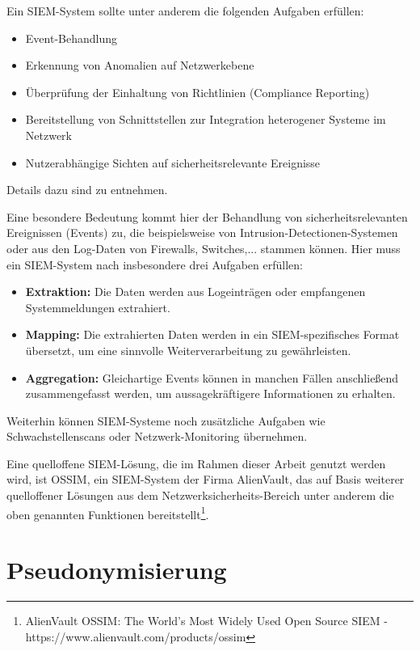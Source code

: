 \documentclass[
    fontsize=12pt,
    headings=small,
    parskip=half,           %
    bibliography=totoc,
    numbers=noenddot,       %
    open=any,               %
   final                   %
    ]{scrreprt}
\begin{document}
Ein SIEM-System sollte unter anderem die folgenden Aufgaben erfüllen: 
\begin{itemize}
	\item Event-Behandlung
	\item Erkennung von Anomalien auf Netzwerkebene
	\item Überprüfung der Einhaltung von Richtlinien (Compliance Reporting)
	\item Bereitstellung von Schnittstellen zur Integration heterogener Systeme im Netzwerk %
	\item Nutzerabhängige Sichten auf sicherheitsrelevante Ereignisse %
\end{itemize} 
Details dazu sind \cite{detken2015} zu entnehmen.

Eine besondere Bedeutung kommt hier der Behandlung von sicherheitsrelevanten Ereignissen (Events) zu, die beispielsweise von Intrusion-Detectionen-Systemen oder aus den Log-Daten von Firewalls, Switches,... stammen können. Hier muss ein SIEM-System nach \cite{detken2014} insbesondere drei Aufgaben erfüllen:
\begin{itemize}
	\item \textbf{Extraktion:} Die Daten werden aus Logeinträgen oder empfangenen Systemmeldungen extrahiert. 
	\item \textbf{Mapping:} Die extrahierten Daten werden in ein SIEM-spezifisches Format übersetzt, um eine sinnvolle Weiterverarbeitung zu gewährleisten.
	\item \textbf{Aggregation:} Gleichartige Events können in manchen Fällen anschließend zusammengefasst werden, um aussagekräftigere Informationen zu erhalten.
\end{itemize}

Weiterhin können SIEM-Systeme noch zusätzliche Aufgaben wie Schwachstellenscans oder Netzwerk-Monitoring übernehmen.

Eine quelloffene SIEM-Lösung, die im Rahmen dieser Arbeit genutzt werden wird, ist OSSIM, ein SIEM-System der Firma AlienVault, das auf Basis weiterer quelloffener Lösungen aus dem Netzwerksicherheits-Bereich unter anderem die oben genannten Funktionen bereitstellt\footnote{
	AlienVault OSSIM: The World’s Most Widely Used Open Source SIEM - https://www.alienvault.com/products/ossim
}.

\section{Pseudonymisierung}
\end{document}

